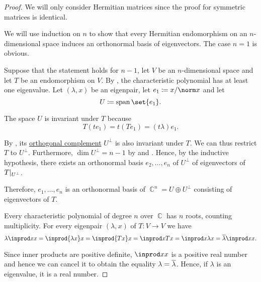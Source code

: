 \begin{proof}
  We will only consider Hermitian matrices since the proof for symmetric matrices is identical.

   We will use induction on \( n \) to show that every Hermitian endomorphism on an \( n \)-dimensional space induces an orthonormal basis of eigenvectors. The case \( n = 1 \) is obvious.

  Suppose that the statement holds for \( n - 1 \), let \( V \) be an \( n \)-dimensional space and let \( T \) be an endomorphism on \( V \). By , the characteristic polynomial has at least one eigenvalue. Let \( (\lambda, x) \) be an eigenpair, let \( e_1 \coloneqq x / \norm x \) and let
  \begin{equation*}
    U \coloneqq \linspan\set{ e_1 }.
  \end{equation*}

  The space \( U \) is invariant under \( T \) because
  \begin{equation*}
    T(t e_1) = t(T e_1) = (t\lambda) e_1.
  \end{equation*}

  By , its \hyperref[def:orthogonality]{orthogonal complement} \( U^\perp \) is also invariant under \( T \). We can thus restrict \( T \) to \( U^\perp \). Furthermore, \( \dim U^\perp = n - 1 \) by  and . Hence, by the inductive hypothesis, there exists an orthonormal basis \( e_2, \ldots, e_n \) of \( U^\perp \) of eigenvectors of \( T\vert_{U^\perp} \).

  Therefore, \( e_1, \ldots, e_n \) is an orthonormal basis of \( \BbbC^n = U \oplus U^\perp \) consisting of eigenvectors of \( T \).

   Every characteristic polynomial of degree \( n \) over \( \BbbC \) has \( n \) roots, counting multiplicity. For every eigenpair \( (\lambda, x) \) of \( T: V \to V \) we have
  \begin{equation*}
    \lambda \inprod x x
    =
    \inprod {\lambda x} x
    =
    \inprod {T x} x
    =
    \inprod x {T x}
    =
    \inprod x {\lambda x}
    =
    \oline \lambda \inprod x x.
  \end{equation*}

  Since inner products are positive definite, \( \inprod x x \) is a positive real number and hence we can cancel it to obtain the equality \( \lambda = \oline \lambda \). Hence, if \( \lambda \) is an eigenvalue, it is a real number.


\end{proof}
